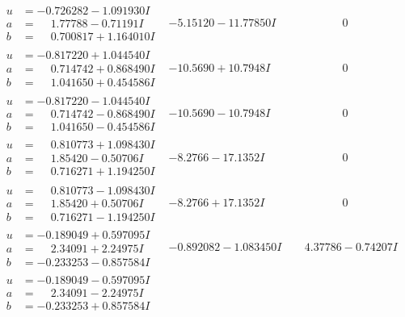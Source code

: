 \documentclass[1p]{elsarticle_modified}
\theoremstyle{definition}
\begin{document}
$$\begin{array}{c|c|c}
\begin{aligned}
u &= -0.726282 - 1.091930 I \\
a &= \phantom{-}1.77788 - 0.71191 I \\
b &= \phantom{-}0.700817 + 1.164010 I\end{aligned}
 & -5.15120 - 11.77850 I & \phantom{-0.000000 } 0 \\ \hline\begin{aligned}
u &= -0.817220 + 1.044540 I \\
a &= \phantom{-}0.714742 + 0.868490 I \\
b &= \phantom{-}1.041650 + 0.454586 I\end{aligned}
 & -10.5690 + 10.7948 I & \phantom{-0.000000 } 0 \\ \hline\begin{aligned}
u &= -0.817220 - 1.044540 I \\
a &= \phantom{-}0.714742 - 0.868490 I \\
b &= \phantom{-}1.041650 - 0.454586 I\end{aligned}
 & -10.5690 - 10.7948 I & \phantom{-0.000000 } 0 \\ \hline\begin{aligned}
u &= \phantom{-}0.810773 + 1.098430 I \\
a &= \phantom{-}1.85420 - 0.50706 I \\
b &= \phantom{-}0.716271 + 1.194250 I\end{aligned}
 & -8.2766 - 17.1352 I & \phantom{-0.000000 } 0 \\ \hline\begin{aligned}
u &= \phantom{-}0.810773 - 1.098430 I \\
a &= \phantom{-}1.85420 + 0.50706 I \\
b &= \phantom{-}0.716271 - 1.194250 I\end{aligned}
 & -8.2766 + 17.1352 I & \phantom{-0.000000 } 0 \\ \hline\begin{aligned}
u &= -0.189049 + 0.597095 I \\
a &= \phantom{-}2.34091 + 2.24975 I \\
b &= -0.233253 - 0.857584 I\end{aligned}
 & -0.892082 - 1.083450 I & \phantom{-}4.37786 - 0.74207 I \\ \hline\begin{aligned}
u &= -0.189049 - 0.597095 I \\
a &= \phantom{-}2.34091 - 2.24975 I \\
b &= -0.233253 + 0.857584 I\end{aligned}

\end{array}$$
\end{document}

